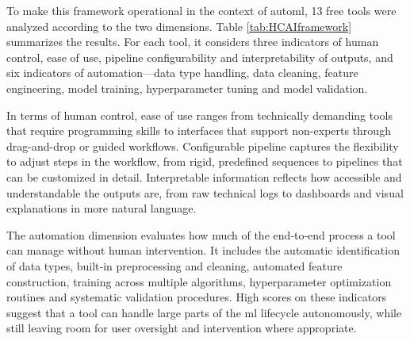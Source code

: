 \documentclass[twoside,final]{Contexto}
\begin{document}
To make this framework operational in the context of \gls{automl}, 13 free tools were analyzed according to the two dimensions. Table \ref{tab:HCAIframework} summarizes the results. For each tool, it considers three indicators of human control, ease of use, pipeline configurability and interpretability of outputs, and six indicators of automation—data type handling, data cleaning, feature engineering, model training, hyperparameter tuning and model validation.

In terms of human control, ease of use ranges from technically demanding tools that require programming skills to interfaces that support non-experts through drag-and-drop or guided workflows. Configurable pipeline captures the flexibility to adjust steps in the workflow, from rigid, predefined sequences to pipelines that can be customized in detail. Interpretable information reflects how accessible and understandable the outputs are, from raw technical logs to dashboards and visual explanations in more natural language.

The automation dimension evaluates how much of the end‑to‑end process a tool can manage without human intervention. It includes the automatic identification of data types, built‑in preprocessing and cleaning, automated feature construction, training across multiple algorithms, hyperparameter optimization routines and systematic validation procedures. High scores on these indicators suggest that a tool can handle large parts of the \gls{ml} lifecycle autonomously, while still leaving room for user oversight and intervention where appropriate.
\end{document}
